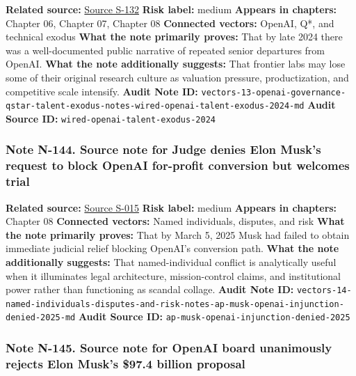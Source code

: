 \documentclass[
  american,
  11pt,
  letterpaper,
]{article}
\begin{document}
\textbf{Related source:}
\hyperref[source-s-132-the-openai-talent-exodus-gives-rivals-an-opening]{Source
S-132} \textbf{Risk label:} medium \textbf{Appears in chapters:} Chapter
06, Chapter 07, Chapter 08 \textbf{Connected vectors:} OpenAI, Q*, and
technical exodus \textbf{What the note primarily proves:} That by late
2024 there was a well-documented public narrative of repeated senior
departures from OpenAI. \textbf{What the note additionally suggests:}
That frontier labs may lose some of their original research culture as
valuation pressure, productization, and competitive scale intensify.
\textbf{Audit Note ID:}
\texttt{vectors-13-openai-governance-qstar-talent-exodus-notes-wired-openai-talent-exodus-2024-md}
\textbf{Audit Source ID:} \texttt{wired-openai-talent-exodus-2024}

\subsubsection{Note N-144. Source note for Judge denies Elon Musk's
request to block OpenAI for-profit conversion but welcomes
trial}\label{note-n-144-vectors-14-named-individuals-disputes-and-risk-notes-ap-musk-openai-injunction-denied-2025-md}

\textbf{Related source:}
\hyperref[source-s-015-judge-denies-elon-musk-s-request-to-block-openai-for-profit-conversion-but-welcomes-trial]{Source
S-015} \textbf{Risk label:} medium \textbf{Appears in chapters:} Chapter
08 \textbf{Connected vectors:} Named individuals, disputes, and risk
\textbf{What the note primarily proves:} That by March 5, 2025 Musk had
failed to obtain immediate judicial relief blocking OpenAI's conversion
path. \textbf{What the note additionally suggests:} That
named-individual conflict is analytically useful when it illuminates
legal architecture, mission-control claims, and institutional power
rather than functioning as scandal collage. \textbf{Audit Note ID:}
\texttt{vectors-14-named-individuals-disputes-and-risk-notes-ap-musk-openai-injunction-denied-2025-md}
\textbf{Audit Source ID:} \texttt{ap-musk-openai-injunction-denied-2025}

\subsubsection{Note N-145. Source note for OpenAI board unanimously
rejects Elon Musk's \$97.4 billion
proposal}\label{note-n-145-vectors-14-named-individuals-disputes-and-risk-notes-ap-openai-board-rejects-musk-bid-2025-md}
\end{document}
